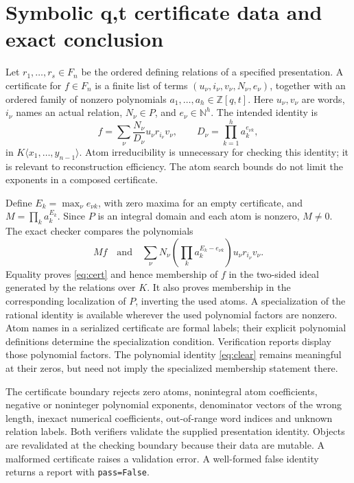 \documentclass[11pt]{article}
\newcommand{\Z}{\mathbb Z}
\begin{document}
\section{Symbolic q,t certificate data and exact conclusion}
Let $r_1,\ldots,r_s\in F_n$ be the ordered defining relations of a specified
presentation. A certificate for $f\in F_n$ is a finite list of terms
$(u_\nu,i_\nu,v_\nu,N_\nu,e_\nu)$, together with an ordered family of nonzero
polynomials $a_1,\ldots,a_h\in\Z[q,t]$. Here $u_\nu,v_\nu$ are words,
$i_\nu$ names an actual relation, $N_\nu\in P$, and
$e_\nu\in\mathbb N^h$. The intended identity is
\begin{equation}\label{eq:cert}
 f=\sum_\nu\frac{N_\nu}{D_\nu}u_\nu r_{i_\nu}v_\nu,
 \qquad D_\nu=\prod_{k=1}^h a_k^{e_{\nu k}},
\end{equation}
in $K\langle x_1,\ldots,y_{n-1}\rangle$. Atom irreducibility is unnecessary
for checking this identity; it is relevant to reconstruction efficiency.
The atom search bounds do not limit the exponents in a composed certificate.

Define $E_k=\max_\nu e_{\nu k}$, with zero maxima for an empty certificate,
and $M=\prod_k a_k^{E_k}$. Since $P$ is an integral domain and each atom is
nonzero, $M\ne0$. The exact checker compares the polynomials
\begin{equation}\label{eq:clear}
 Mf\quad\text{and}\quad
 \sum_\nu N_\nu\left(\prod_k a_k^{E_k-e_{\nu k}}\right)
                   u_\nu r_{i_\nu}v_\nu.
\end{equation}
Equality proves \eqref{eq:cert} and hence membership of $f$ in the two-sided
ideal generated by the relations over $K$. It also proves membership in the
corresponding localization of $P$, inverting the used atoms. A specialization
of the rational identity is available wherever the used polynomial factors are
nonzero. Atom names in a serialized certificate are formal labels; their explicit
polynomial definitions determine the specialization condition. Verification
reports display those polynomial factors. The polynomial identity \eqref{eq:clear} remains meaningful at their
zeros, but need not imply the specialized membership statement there.

The certificate boundary rejects zero atoms, nonintegral atom coefficients,
negative or noninteger polynomial exponents, denominator vectors of the wrong
length, inexact numerical coefficients, out-of-range word indices and unknown
relation labels. Both verifiers validate the supplied presentation identity.
Objects are revalidated at the checking boundary because their data are mutable.
A malformed certificate raises a validation error. A well-formed false identity
returns a report with \texttt{pass=False}.
\end{document}
